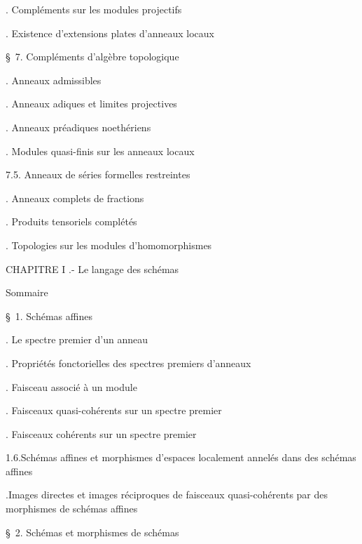 \noindent{}. Compléments sur les modules projectifs\dotfill

\noindent{}. Existence d'extensions plates d'anneaux locaux\dotfill

\noindent\quad {}

\noindent\quad \S\ 7. Compléments d'algèbre topologique\dotfill

\noindent{}. Anneaux admissibles\dotfill

\noindent{}. Anneaux adiques et limites projectives\dotfill

\noindent{}. Anneaux préadiques noethériens\dotfill

\noindent{}. Modules quasi-finis sur les anneaux locaux\dotfill

\noindent\qquad {} 7.5. Anneaux de séries formelles restreintes\dotfill

\noindent{}. Anneaux complets de fractions\dotfill



\noindent{}. Produits tensoriels complétés\dotfill

\noindent{}. Topologies sur les modules d'homomorphismes\dotfill

\noindent CHAPITRE I .- Le langage des schémas\dotfill

\noindent\quad Sommaire\dotfill

\noindent\quad \S\ 1. Schémas affines\dotfill

\noindent{}. Le spectre premier d'un anneau\dotfill

\noindent{}. Propriétés fonctorielles des spectres premiers d'anneaux\dotfill

\noindent{}. Faisceau associé à un module\dotfill

\noindent{}. Faisceaux quasi-cohérents sur un spectre premier\dotfill

\noindent{}. Faisceaux cohérents sur un spectre premier\dotfill

\noindent\qquad {}1.6.Schémas affines et morphismes d'espaces localement annelés dans des schémas affines\dotfill

\noindent{}.Images directes et images réciproques de faisceaux quasi-cohérents par des morphismes de schémas affines\dotfill

\noindent\quad \S\ 2. Schémas et morphismes de schémas\dotfill

